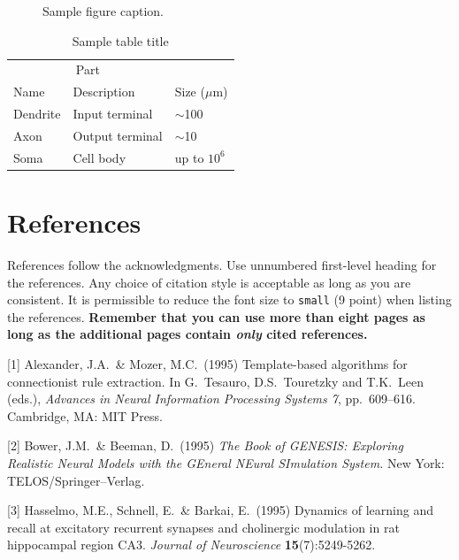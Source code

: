 \documentclass{article}
\begin{document}
	
	
	\begin{figure}
		\centering
		\fbox{\rule[-.5cm]{0cm}{4cm} \rule[-.5cm]{4cm}{0cm}}
		\caption{Sample figure caption.}
	\end{figure}
	\begin{table}
		\caption{Sample table title}
		\label{sample-table}
		\centering
		\begin{tabular}{lll}
			\toprule
			\multicolumn{2}{c}{Part}                   \\
			\cmidrule(r){1-2}
			Name     & Description     & Size ($\mu$m) \\
			\midrule
			Dendrite & Input terminal  & $\sim$100     \\
			Axon     & Output terminal & $\sim$10      \\
			Soma     & Cell body       & up to $10^6$  \\
			\bottomrule
		\end{tabular}
	\end{table}

	\section*{References}
	
	References follow the acknowledgments. Use unnumbered first-level heading for
	the references. Any choice of citation style is acceptable as long as you are
	consistent. It is permissible to reduce the font size to \verb+small+ (9 point)
	when listing the references. {\bf Remember that you can use more than eight
		pages as long as the additional pages contain \emph{only} cited references.}
	\medskip
	
	\small
	
	[1] Alexander, J.A.\ \& Mozer, M.C.\ (1995) Template-based algorithms for
	connectionist rule extraction. In G.\ Tesauro, D.S.\ Touretzky and T.K.\ Leen
	(eds.), {\it Advances in Neural Information Processing Systems 7},
	pp.\ 609--616. Cambridge, MA: MIT Press.
	
	[2] Bower, J.M.\ \& Beeman, D.\ (1995) {\it The Book of GENESIS: Exploring
		Realistic Neural Models with the GEneral NEural SImulation System.}  New York:
	TELOS/Springer--Verlag.
	
	[3] Hasselmo, M.E., Schnell, E.\ \& Barkai, E.\ (1995) Dynamics of learning and
	recall at excitatory recurrent synapses and cholinergic modulation in rat
	hippocampal region CA3. {\it Journal of Neuroscience} {\bf 15}(7):5249-5262.
	
\end{document}
